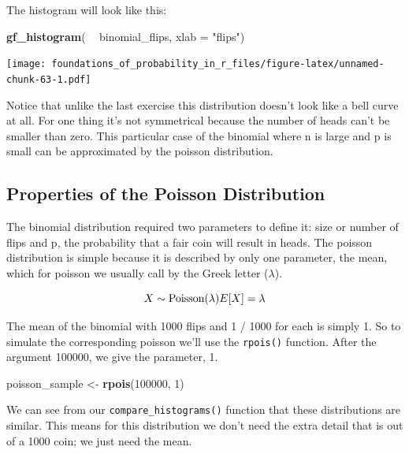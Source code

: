 \documentclass[]{article}
\newenvironment{Shaded}{\begin{snugshade}}{\end{snugshade}}
\newcommand{\DataTypeTok}[1]{\textcolor[rgb]{0.13,0.29,0.53}{#1}}
\newcommand{\DecValTok}[1]{\textcolor[rgb]{0.00,0.00,0.81}{#1}}
\newcommand{\KeywordTok}[1]{\textcolor[rgb]{0.13,0.29,0.53}{\textbf{#1}}}
\newcommand{\NormalTok}[1]{#1}
\newcommand{\OperatorTok}[1]{\textcolor[rgb]{0.81,0.36,0.00}{\textbf{#1}}}
\newcommand{\StringTok}[1]{\textcolor[rgb]{0.31,0.60,0.02}{#1}}
\begin{document}
The histogram will look like this:

\begin{Shaded}
\begin{Highlighting}[]
\KeywordTok{gf_histogram}\NormalTok{( }\OperatorTok{~}\StringTok{ }\NormalTok{binomial_flips, }\DataTypeTok{xlab =} \StringTok{"flips"}\NormalTok{)}
\end{Highlighting}
\end{Shaded}

\texttt{[image: foundations\_of\_probability\_in\_r\_files/figure-latex/unnamed-chunk-63-1.pdf]}

Notice that unlike the last exercise this distribution doesn't look like
a bell curve at all. For one thing it's not symmetrical because the
number of heads can't be smaller than zero. This particular case of the
binomial where n is large and p is small can be approximated by the
poisson distribution.

\hypertarget{properties-of-the-poisson-distribution}{%
\subsection{Properties of the Poisson
Distribution}\label{properties-of-the-poisson-distribution}}

The binomial distribution required two parameters to define it: size or
number of flips and p, the probability that a fair coin will result in
heads. The poisson distribution is simple because it is described by
only one parameter, the mean, which for poisson we usually call by the
Greek letter (\(\lambda\)).

\[X \sim \textrm{Poisson}(\lambda) \\ E[X] = \lambda\]

The mean of the binomial with 1000 flips and 1 / 1000 for each is simply
1. So to simulate the corresponding poisson we'll use the
\texttt{rpois()} function. After the argument 100000, we give the
parameter, 1.

\begin{Shaded}
\begin{Highlighting}[]
\NormalTok{poisson_sample <-}\StringTok{ }\KeywordTok{rpois}\NormalTok{(}\DecValTok{100000}\NormalTok{, }\DecValTok{1}\NormalTok{)}
\end{Highlighting}
\end{Shaded}

We can see from our \texttt{compare\_histograms()} function that these
distributions are similar. This means for this distribution we don't
need the extra detail that is out of a 1000 coin; we just need the mean.
\end{document}
